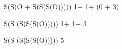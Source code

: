 \documentclass{beamer}
\newcommand{\ca}[1]{{\color{blue}#1}}
\newcommand{\cb}[1]{{\color{violet}#1}}
\begin{document}
\begin{frame}[t,fragile]
\begin{center}
\begin{overprint}
\begin{semiverbatim}
S(S(\ca{O}   + \cb{S(S(S(O)))}))             1+ 1+ (0 + 3)
\end{semiverbatim}

\begin{semiverbatim}
S(S      (\cb{S(S(S(O)))}))             1+ 1+ 3
\end{semiverbatim}

\begin{semiverbatim}
S(S      (S(S(S(O)))))                   5
\end{semiverbatim}

\end{overprint}
\end{center}

\end{frame}
\end{document}
